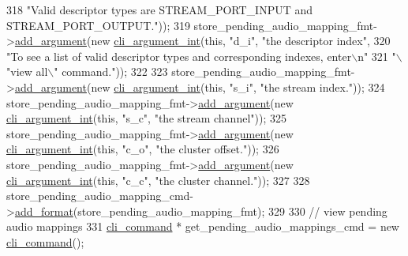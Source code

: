 \begin{DoxyCode}
318                                                                           \textcolor{stringliteral}{"Valid descriptor types are
       STREAM\_PORT\_INPUT and STREAM\_PORT\_OUTPUT."}));
319     store\_pending\_audio\_mapping\_fmt->\hyperlink{classcli__command__format_ac3fc6d13a227c195d5ee6f7b78eba9cd}{add\_argument}(\textcolor{keyword}{new} 
      \hyperlink{classcli__argument__int}{cli\_argument\_int}(\textcolor{keyword}{this}, \textcolor{stringliteral}{"d\_i"}, \textcolor{stringliteral}{"the descriptor index"},
320                                                                        \textcolor{stringliteral}{"To see a list of valid descriptor
       types and corresponding indexes, enter\(\backslash\)n"}
321                                                                        \textcolor{stringliteral}{"\(\backslash\)"view all\(\backslash\)" command."}));
322 
323     store\_pending\_audio\_mapping\_fmt->\hyperlink{classcli__command__format_ac3fc6d13a227c195d5ee6f7b78eba9cd}{add\_argument}(\textcolor{keyword}{new} 
      \hyperlink{classcli__argument__int}{cli\_argument\_int}(\textcolor{keyword}{this}, \textcolor{stringliteral}{"s\_i"}, \textcolor{stringliteral}{"the stream index."}));
324     store\_pending\_audio\_mapping\_fmt->\hyperlink{classcli__command__format_ac3fc6d13a227c195d5ee6f7b78eba9cd}{add\_argument}(\textcolor{keyword}{new} 
      \hyperlink{classcli__argument__int}{cli\_argument\_int}(\textcolor{keyword}{this}, \textcolor{stringliteral}{"s\_c"}, \textcolor{stringliteral}{"the stream channel"}));
325     store\_pending\_audio\_mapping\_fmt->\hyperlink{classcli__command__format_ac3fc6d13a227c195d5ee6f7b78eba9cd}{add\_argument}(\textcolor{keyword}{new} 
      \hyperlink{classcli__argument__int}{cli\_argument\_int}(\textcolor{keyword}{this}, \textcolor{stringliteral}{"c\_o"}, \textcolor{stringliteral}{"the cluster offset."}));
326     store\_pending\_audio\_mapping\_fmt->\hyperlink{classcli__command__format_ac3fc6d13a227c195d5ee6f7b78eba9cd}{add\_argument}(\textcolor{keyword}{new} 
      \hyperlink{classcli__argument__int}{cli\_argument\_int}(\textcolor{keyword}{this}, \textcolor{stringliteral}{"c\_c"}, \textcolor{stringliteral}{"the cluster channel."}));
327 
328     store\_pending\_audio\_mapping\_cmd->\hyperlink{classcli__command_aa9ec38e761644d946f8db2b920e39921}{add\_format}(store\_pending\_audio\_mapping\_fmt);
329 
330     \textcolor{comment}{// view pending audio mappings}
331     \hyperlink{classcli__command}{cli\_command} * get\_pending\_audio\_mappings\_cmd = \textcolor{keyword}{new} \hyperlink{classcli__command}{cli\_command}();

\end{DoxyCode}
